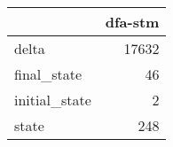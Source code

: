 \begin{tabular}{lr}
\toprule
{} &  dfa-stm \\
\midrule
delta         &    17632 \\
final\_state   &       46 \\
initial\_state &        2 \\
state         &      248 \\
\bottomrule
\end{tabular}
